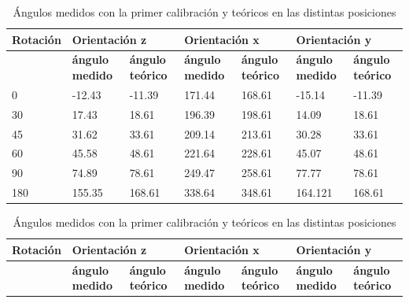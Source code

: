 \documentclass[spanish,12pt,a4paper,titlepage]{report}
\begin{document}
\begin{table}
\begin{tabular}{|p{50pt}|p{50pt}|p{50pt}|p{50pt}|p{51pt}|p{50pt}|p{50pt}|}
\hline
 {\cellcolor[gray]{0.6} \textbf{Rotación}}  
& \multicolumn{2}{|p{113pt}|}{\cellcolor[gray]{0.6} \textbf{Orientación z}}  
& \multicolumn{2}{|p{114pt}|}{\cellcolor[gray]{0.6} \textbf{Orientación x}}
& \multicolumn{2}{|p{113pt}|}{\cellcolor[gray]{0.6} \textbf{Orientación y}} 
\\ \hline 
   
& \multicolumn{1}{|p{50pt}|}{\cellcolor[gray]{0.7} \textbf{ángulo medido }} 
& \multicolumn{1}{|p{50pt}|}{\cellcolor[gray]{0.8} \textbf{ángulo teórico}}
& \multicolumn{1}{|p{50pt}|}{\cellcolor[gray]{0.7} \textbf{ángulo medido}} 
& \multicolumn{1}{|p{51pt}|}{\cellcolor[gray]{0.8} \textbf{ángulo teórico}}
& \multicolumn{1}{|p{50pt}|}{\cellcolor[gray]{0.7} \textbf{ángulo medido}} 
& \multicolumn{1}{|p{50pt}|}{\cellcolor[gray]{0.8} \textbf{ángulo teórico}}
\\ \hline

 0    &    -12.43  & -11.39& 171.44& 168.61&-15.14 & -11.39\\ \hline
 30   &   17.43    & 18.61& 196.39& 198.61 & 14.09 & 18.61 \\ \hline
 45   &   31.62 	  &	33.61 & 209.14 & 213.61 & 30.28 & 33.61 \\ \hline
 60   &   45.58 	  & 48.61 & 221.64 & 228.61 & 45.07 & 48.61 \\ \hline
 90   &   74.89 	  & 78.61 & 249.47 & 258.61 & 77.77 & 78.61 \\ \hline
 180  &   155.35	  &	168.61& 338.64 & 348.61 & 164.121 & 168.61 \\ \hline
 
\end{tabular}
\caption{Ángulos medidos con la primer calibración y teóricos en las distintas posiciones}



\begin{tabular}{|p{50pt}|p{50pt}|p{50pt}|p{50pt}|p{51pt}|p{50pt}|p{50pt}|}
\hline
 {\cellcolor[gray]{0.6} \textbf{Rotación}}  
& \multicolumn{2}{|p{113pt}|}{\cellcolor[gray]{0.6} \textbf{Orientación z}}  
& \multicolumn{2}{|p{114pt}|}{\cellcolor[gray]{0.6} \textbf{Orientación x}}
& \multicolumn{2}{|p{113pt}|}{\cellcolor[gray]{0.6} \textbf{Orientación y}} 
\\ \hline 
   
& \multicolumn{1}{|p{50pt}|}{\cellcolor[gray]{0.7} \textbf{ángulo medido }} 
& \multicolumn{1}{|p{50pt}|}{\cellcolor[gray]{0.8} \textbf{ángulo teórico}}
& \multicolumn{1}{|p{50pt}|}{\cellcolor[gray]{0.7} \textbf{ángulo medido}} 
& \multicolumn{1}{|p{51pt}|}{\cellcolor[gray]{0.8} \textbf{ángulo teórico}}
& \multicolumn{1}{|p{50pt}|}{\cellcolor[gray]{0.7} \textbf{ángulo medido}} 
& \multicolumn{1}{|p{50pt}|}{\cellcolor[gray]{0.8} \textbf{ángulo teórico}}
\\ \hline


\end{tabular}
\end{table}
\end{document}
